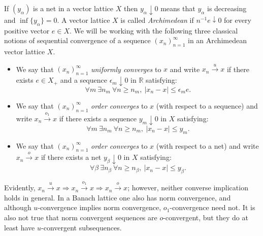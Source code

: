 \documentclass[12pt,leqno]{amsart}
\numberwithin{equation}{section}
\theoremstyle{definition}
\begin{document}
If $(y_\alpha)$ is a net in a vector lattice $X$ then  $y_{\alpha}\downarrow 0$ means that $y_\alpha$ is decreasing and $\inf\{y_\alpha\}=0$.  A vector lattice $X$ is called {\em Archimedean} if $n^{-1}e\downarrow 0$ for every positive vector $e\in X$.  We will be working with the
following three classical notions of sequential convergence of a sequence $(x_n)_{n=1}^\infty$ in an Archimedean vector lattice $X$.
\begin{itemize}
\item We say that $(x_n)_{n=1}^\infty$ {\em uniformly converges} to $x$ and write $x_n\xrightarrow{u}x$ if there exists $e\in X_+$ and a sequence $\epsilon_m\downarrow 0$ in $\mathbb{R}$ satisfying: $$\forall m\ \exists n_m \ \forall n\geq n_m,\ |x_n-x|\leq\epsilon_m e.$$
\item We say that $(x_n)_{n=1}^\infty$ {\em order converges} to $x$ (with respect to a sequence)  and write $x_n\xrightarrow{o_1}x$ if there exists a sequence $y_m\downarrow 0$ in $X$ satisfying: $$\forall m\ \exists n_m \ \forall n\geq n_m, \ |x_n-x|\leq y_m.$$
\item We say that $(x_n)_{n=1}^\infty$ {\em order converges} to $x$ (with respect to a net)  and write $x_n\xrightarrow{o}x$ if there exists a net $y_{\beta}\downarrow 0$ in $X$ satisfying: $$\forall \beta\ \exists n_{\beta} \ \forall n \geq n_{\beta}, \ |x_n-x|\leq y_{\beta}.$$
\end{itemize}
 Evidently, $x_n\xrightarrow{u}x\Rightarrow x_n\xrightarrow{o_1}x \Rightarrow x_n\xrightarrow{o}x$; however, neither converse implication holds in general. In a Banach lattice one also has norm convergence, and although  $u$-convergence implies norm convergence, $o_1$-convergence need not. It is also not true that norm convergent sequences are $o$-convergent, but they do at least have $u$-convergent subsequences. %
 \medskip
\end{document}
